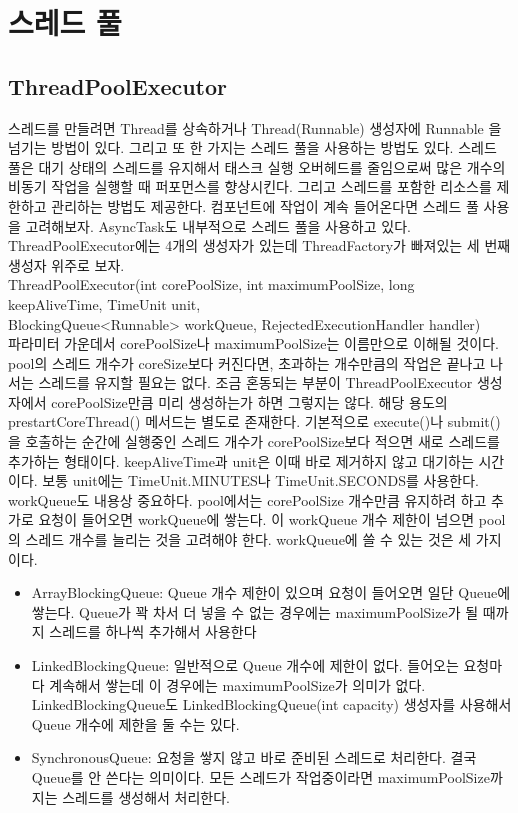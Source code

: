 \section{스레드 풀}
\subsection{ThreadPoolExecutor}
스레드를 만들려면 Thread를 상속하거나 Thread(Runnable) 생성자에 Runnable 을 넘기는 방법이 있다. 그리고 또 한 가지는 스레드 풀을 사용하는 방법도 있다.
스레드 풀은 대기 상태의 스레드를 유지해서 태스크 실행 오버헤드를 줄임으로써 많은 개수의 비동기 작업을 실행할 때 퍼포먼스를 향상시킨다. 
그리고 스레드를 포함한 리소스를 제한하고 관리하는 방법도 제공한다. 
컴포넌트에 작업이 계속 들어온다면 스레드 풀 사용을 고려해보자. AsyncTask도 내부적으로 스레드 풀을 사용하고 있다.\\

ThreadPoolExecutor에는 4개의 생성자가 있는데 ThreadFactory가 빠져있는 세 번째 생성자 위주로 보자.\\

ThreadPoolExecutor(int corePoolSize, int maximumPoolSize, long keepAliveTime, TimeUnit unit,\\ BlockingQueue<Runnable> workQueue, RejectedExecutionHandler handler)\\

파라미터 가운데서 corePoolSize나 maximumPoolSize는 이름만으로 이해될 것이다. 
pool의 스레드 개수가 coreSize보다 커진다면, 초과하는 개수만큼의 작업은 끝나고 나서는 스레드를 유지할 필요는 없다. 
조금 혼동되는 부분이 ThreadPoolExecutor 생성자에서 corePoolSize만큼 미리 생성하는가 하면 그렇지는 않다. 해당 용도의  prestartCoreThread() 메서드는 별도로 존재한다. 기본적으로 execute()나 submit()을 호출하는 순간에 실행중인 스레드 개수가 corePoolSize보다 적으면 새로 스레드를 추가하는 형태이다.
keepAliveTime과 unit은 이때 바로 제거하지 않고 대기하는 시간이다. 보통 unit에는 TimeUnit.MINUTES나 TimeUnit.SECONDS를 사용한다.
workQueue도 내용상 중요하다. pool에서는 corePoolSize 개수만큼 유지하려 하고 추가로 요청이 들어오면 workQueue에 쌓는다. 이 workQueue 개수 제한이 넘으면 pool의 스레드 개수를 늘리는 것을 고려해야 한다. workQueue에 쓸 수 있는 것은 세 가지이다.
\begin{itemize}
\item ArrayBlockingQueue: Queue 개수 제한이 있으며 요청이 들어오면 일단 Queue에 쌓는다. Queue가 꽉 차서 더 넣을 수 없는 경우에는 maximumPoolSize가 될 때까지 스레드를 하나씩 추가해서 사용한다
\item LinkedBlockingQueue: 일반적으로 Queue 개수에 제한이 없다. 들어오는 요청마다 계속해서 쌓는데 이 경우에는 maximumPoolSize가 의미가 없다. LinkedBlockingQueue도 LinkedBlockingQueue(int capacity) 생성자를 사용해서 Queue 개수에 제한을 둘 수는 있다.
\item SynchronousQueue: 요청을 쌓지 않고 바로 준비된 스레드로 처리한다. 결국 Queue를 안 쓴다는 의미이다.
모든 스레드가 작업중이라면 maximumPoolSize까지는 스레드를 생성해서 처리한다. 
\end{itemize}

